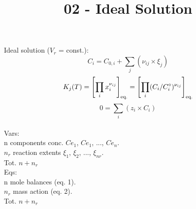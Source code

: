 \documentclass{article}
\begin{document}
\title{02 - Ideal Solution}
\author{}
\date{}
\maketitle
Ideal solution ($V_r$ = const.):
\begin{equation}
C_i = C_{0,i} + \sum_j(\nu_{ij} \times \xi_j)
\end{equation}
\begin{equation}
K_j(T) = \left[ \prod_ix_i^{\nu_{ij}} \right]_{\textnormal{eq.}}= 
\left[ \prod_i(C_i/C^{\circ}_i)^{\nu_{ij}} \right]_{\textnormal{eq.}}
\end{equation}
\begin{equation}
0 = \sum_i(z_i \times C_i)
\end{equation}
\\
Vars: \\
n components conc. $Ce_1$, $Ce_1$, ..., $Ce_n$. \\
$n_r$ reaction extents $\xi_1$, $\xi_2$, ..., $\xi_{nr}$. \\
Tot. $n + n_r$ \\
Eqs: \\
n mole balances (eq. 1). \\
$n_r$ mass action (eq. 2). \\
Tot. $n + n_r$
\end{document}
